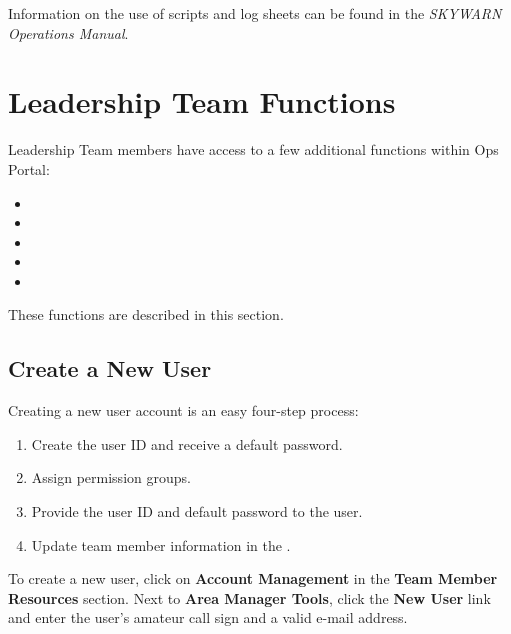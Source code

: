 \documentclass[pdflatex,letterpaper,twoside,12pt]{book}
\begin{document}
Information on the use of scripts and log sheets can be found in the \emph{SKYWARN Operations Manual}.


\section{Leadership Team Functions}

Leadership Team members have access to a few additional functions within Ops Portal:

\begin{itemize}
\item {}
\item {}
\item {}
\item {}
\item {}
\end{itemize}

These functions are described in this section.

\subsection{Create a New User}\label{ops-create-new-user}

Creating a new user account is an easy four-step process:

\begin{enumerate}
\item Create the user ID and receive a default password.
\item Assign permission groups.
\item Provide the user ID and default password to the user.
\item Update team member information in the .
\end{enumerate}

To create a new user, click on \textbf{Account Management} in the \textbf{Team Member Resources} section.  Next to \textbf{Area Manager Tools}, click the \textbf{New User} link and enter the user's amateur call sign and a valid e-mail address.

\end{document}
